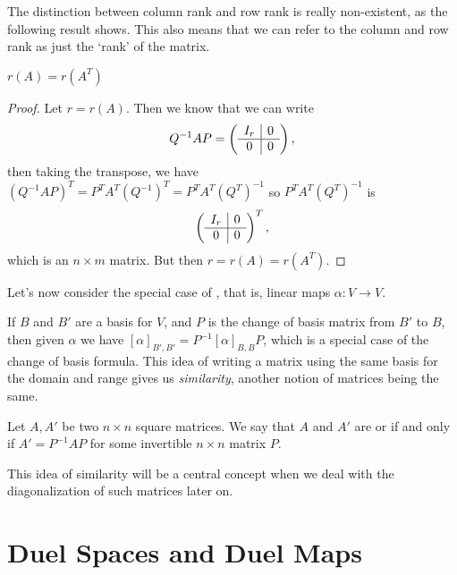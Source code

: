 \documentclass[a4paper]{scrartcl}
\begin{document}
The distinction between column rank and row rank is really non-existent, as the following result shows. This also means that we can refer to the column and row rank as just the `rank' of the matrix.

\begin{theorem}
    $r(A) = r(A^T)$
\end{theorem}
\begin{proof}
    Let $r = r(A)$. Then we know that 
    we can write
    $$
    Q^{-1}AP = \left(\begin{array}{ c | c }
        I_r & 0 \\
        \hline
        0 & 0
      \end{array}\right),
    $$
    then taking the transpose, we have $(Q^{-1}AP)^T = P^T A^T (Q^{-1})^T = P^T A^T (Q^T)^{-1}$
    so $P^T A^T (Q^T)^{-1}$ is 
    $$
    \left(\begin{array}{ c | c }
        I_r & 0 \\
        \hline
        0 & 0
      \end{array}\right)^T,
    $$
    which is an $n \times m$ matrix. But then $r = r(A) = r(A^T)$.
\end{proof}

Let's now consider the special case of , that is, linear maps $\alpha: V \rightarrow V$.

If $B$ and $B'$ are a basis for $V$, and $P$ is the change of basis matrix from $B'$ to $B$, then given $\alpha$ we have $[\alpha]_{B', B'} = P^{-1}[\alpha]_{B, B}P$, which is a special case of the change of basis formula.
This idea of writing a matrix using the same basis for the domain and range gives us \emph{similarity}, another notion of matrices being the same.

\begin{definition}
    Let $A, A'$ be two $n \times n$ square matrices. We say that $A$ and $A'$ are  or  if and only if  $A' = P^{-1} A P$ for some invertible $n \times n$ matrix $P$.
\end{definition}

This idea of similarity will be a central concept when we deal with the diagonalization of such matrices later on.


\section{Duel Spaces and Duel Maps}
\end{document}
